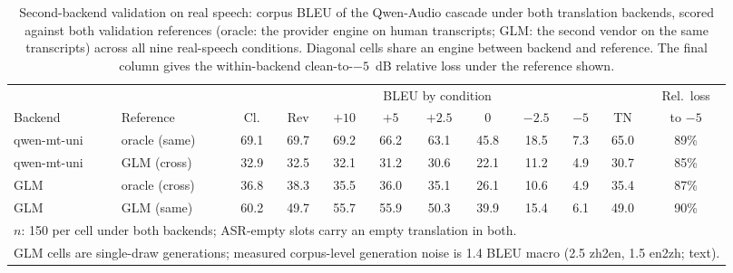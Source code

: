 \begin{table}[t]
\centering
\caption{Second-backend validation on real speech: corpus BLEU of the
Qwen-Audio cascade under both translation backends, scored against both
validation references (oracle: the provider engine on human transcripts;
GLM: the second vendor on the same transcripts) across all nine
real-speech conditions. Diagonal cells share an
engine between backend and reference. The final column gives the
within-backend clean-to-$-5$~dB relative loss under the reference shown.}
\label{tab:backend}
\footnotesize
\setlength{\tabcolsep}{1.8pt}
\begin{tabular}{llcccccccccc}
\toprule
 & & \multicolumn{9}{c}{BLEU by condition} & Rel.\ loss \\
Backend & Reference & Cl. & Rev & $+10$ & $+5$ & $+2.5$ & 0 & $-2.5$ & $-5$ & TN & to $-5$ \\
\midrule
qwen-mt-uni & oracle (same) & 69.1 & 69.7 & 69.2 & 66.2 & 63.1 & 45.8 & 18.5 & 7.3 & 65.0 & 89\% \\
qwen-mt-uni & GLM (cross) & 32.9 & 32.5 & 32.1 & 31.2 & 30.6 & 22.1 & 11.2 & 4.9 & 30.7 & 85\% \\
GLM & oracle (cross) & 36.8 & 38.3 & 35.5 & 36.0 & 35.1 & 26.1 & 10.6 & 4.9 & 35.4 & 87\% \\
GLM & GLM (same) & 60.2 & 49.7 & 55.7 & 55.9 & 50.3 & 39.9 & 15.4 & 6.1 & 49.0 & 90\% \\
\bottomrule
\multicolumn{12}{l}{\footnotesize $n$: 150 per cell under both backends; ASR-empty slots carry an empty translation in both.} \\
\multicolumn{12}{l}{\footnotesize GLM cells are single-draw generations; measured corpus-level generation noise is 1.4 BLEU macro (2.5 zh2en, 1.5 en2zh; text).} \\
\end{tabular}
\end{table}


